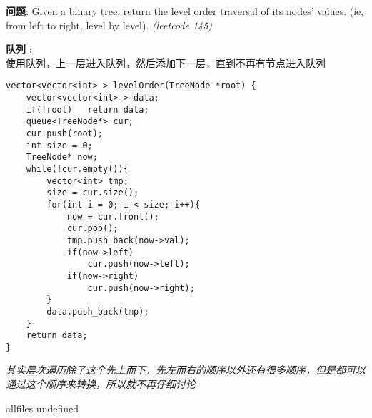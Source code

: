 \documentclass{article}
\begin{document}
\begin{CJK}{UTF8}{gbsn}     %

\else
	
\begin{description}
	\item{\textbf{问题}}: Given a binary tree, return the level order traversal of its nodes' values. (ie, from left to right, level by level). \textit{(leetcode 145)}
	\item{\textbf{队列}} : 
	\\使用队列，上一层进入队列，然后添加下一层，直到不再有节点进入队列
	\begin{lstlisting}
vector<vector<int> > levelOrder(TreeNode *root) {
	vector<vector<int> > data;
	if(!root)	return data;
	queue<TreeNode*> cur;
	cur.push(root);
	int size = 0;
	TreeNode* now;
	while(!cur.empty()){
		vector<int> tmp;
		size = cur.size();
		for(int i = 0; i < size; i++){
			now = cur.front();
			cur.pop();
			tmp.push_back(now->val);
			if(now->left)
				cur.push(now->left);
			if(now->right)
				cur.push(now->right);
		}
		data.push_back(tmp);
	}
	return data;
}
	\end{lstlisting}
	\textit{其实层次遍历除了这个先上而下，先左而右的顺序以外还有很多顺序，但是都可以通过这个顺序来转换，所以就不再仔细讨论}
\end{description}

\fi

\ifx allfiles undefined
\end{CJK}
\end{document}

